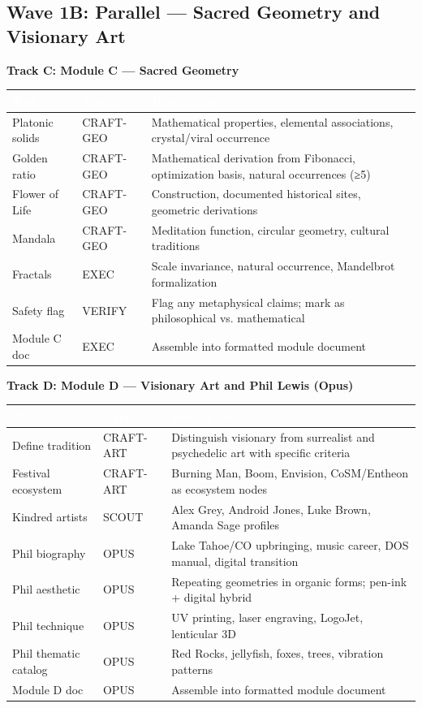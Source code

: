 \documentclass[11pt,letterpaper]{article}
\newcommand{\tableheader}[1]{\textbf{\sffamily\textcolor{white}{#1}}}
\begin{document}
\subsection{Wave 1B: Parallel --- Sacred Geometry and Visionary Art}

\textbf{Track C: Module C --- Sacred Geometry}
\begin{center}
\begin{tabularx}{\textwidth}{L{2.5cm}L{1.5cm}X}
\toprule
{}
\tableheader{Task} & \tableheader{Agent} & \tableheader{Description} \\
\midrule
Platonic solids & CRAFT-GEO & Mathematical properties, elemental associations, crystal/viral occurrence \\
Golden ratio & CRAFT-GEO & Mathematical derivation from Fibonacci, optimization basis, natural occurrences (≥5) \\
Flower of Life & CRAFT-GEO & Construction, documented historical sites, geometric derivations \\
Mandala & CRAFT-GEO & Meditation function, circular geometry, cultural traditions \\
Fractals & EXEC & Scale invariance, natural occurrence, Mandelbrot formalization \\
Safety flag & VERIFY & Flag any metaphysical claims; mark as philosophical vs. mathematical \\
Module C doc & EXEC & Assemble into formatted module document \\
\bottomrule
\end{tabularx}
\end{center}

\textbf{Track D: Module D --- Visionary Art and Phil Lewis (Opus)}
\begin{center}
\begin{tabularx}{\textwidth}{L{2.5cm}L{1.5cm}X}
\toprule
{}
\tableheader{Task} & \tableheader{Agent} & \tableheader{Description} \\
\midrule
Define tradition & CRAFT-ART & Distinguish visionary from surrealist and psychedelic art with specific criteria \\
Festival ecosystem & CRAFT-ART & Burning Man, Boom, Envision, CoSM/Entheon as ecosystem nodes \\
Kindred artists & SCOUT & Alex Grey, Android Jones, Luke Brown, Amanda Sage profiles \\
Phil biography & OPUS & Lake Tahoe/CO upbringing, music career, DOS manual, digital transition \\
Phil aesthetic & OPUS & Repeating geometries in organic forms; pen-ink + digital hybrid \\
Phil technique & OPUS & UV printing, laser engraving, LogoJet, lenticular 3D \\
Phil thematic catalog & OPUS & Red Rocks, jellyfish, foxes, trees, vibration patterns \\
Module D doc & OPUS & Assemble into formatted module document \\
\bottomrule
\end{tabularx}
\end{center}
\end{document}
